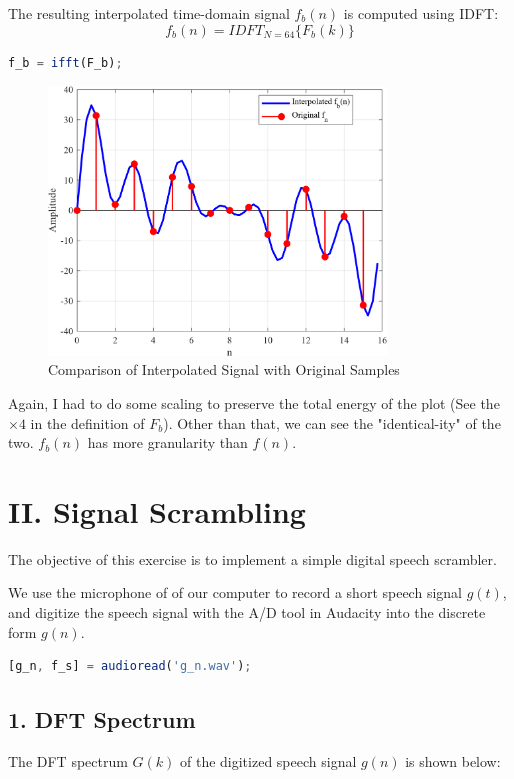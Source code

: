 \documentclass[12pt]{article}
\begin{document}
\vspace{0.5 cm}
The resulting interpolated time-domain signal $f_b(n)$ is computed using IDFT:
\[  f_b(n) = IDFT_{N = 64} \{F_b(k)\} \]

\begin{lstlisting}[language=Octave, caption=IFFT]
f_b = ifft(F_b);
\end{lstlisting}

\begin{figure}[H]
    \centering
    \includegraphics[width=0.8\textwidth]{f_b.png}
    \caption{Comparison of Interpolated Signal with Original Samples}
\end{figure}

Again, I had to do some scaling to preserve the total energy of the plot (See the $\times 4$ in the definition of $F_b$). Other than that, we can see the "identical-ity" of the two. $f_b(n)$ has more granularity than $f(n)$. 


\newpage
\section*{II. Signal Scrambling}
The objective of this exercise is to implement a simple digital speech scrambler.

We use the microphone of of our computer to record a short speech signal $g(t)$, and digitize the speech signal with the A/D tool in Audacity into the discrete form $g(n)$.

\begin{lstlisting}[language=Octave, caption=Reading in Audio File]
[g_n, f_s] = audioread('g_n.wav');
\end{lstlisting}


\subsection*{1. DFT Spectrum}
The DFT spectrum $G(k)$ of the digitized speech signal $g(n)$ is shown below:
\end{document}
